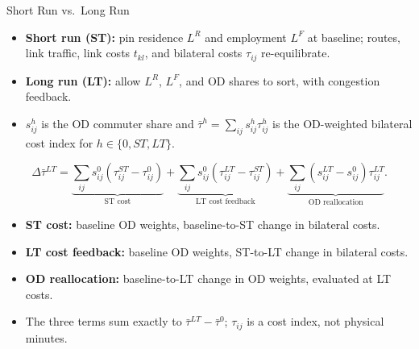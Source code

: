 \documentclass[11pt,aspectratio=169]{beamer}
\begin{document}
\begin{frame}{Short Run vs.\ Long Run}
\small
\begin{itemize}
  \item \textbf{Short run (ST):} pin residence $L^R$ and employment $L^F$ at baseline; routes, link traffic, link costs $t_{kl}$, and bilateral costs $\tau_{ij}$ re-equilibrate.
  \item \textbf{Long run (LT):} allow $L^R$, $L^F$, and OD shares to sort, with congestion feedback.
  \item $s_{ij}^h$ is the OD commuter share and $\bar\tau^h=\sum_{ij}s_{ij}^h\tau_{ij}^h$ is the OD-weighted bilateral cost index for $h\in\{0,ST,LT\}$.
\end{itemize}
\vspace{-0.55em}
{\footnotesize
\begin{equation*}
\Delta\bar\tau^{LT}=
\underbrace{\textstyle\sum_{ij}s_{ij}^0\left(\tau_{ij}^{ST}-\tau_{ij}^0\right)}_{\text{ST cost}}
+\underbrace{\textstyle\sum_{ij}s_{ij}^0\left(\tau_{ij}^{LT}-\tau_{ij}^{ST}\right)}_{\text{LT cost feedback}}
+\underbrace{\textstyle\sum_{ij}\left(s_{ij}^{LT}-s_{ij}^0\right)\tau_{ij}^{LT}}_{\text{OD reallocation}}.
\end{equation*}
}
\vspace{-0.85em}
\begin{itemize}\scriptsize\setlength\itemsep{0.25em}
  \item \textbf{ST cost:} baseline OD weights, baseline-to-ST change in bilateral costs.
  \item \textbf{LT cost feedback:} baseline OD weights, ST-to-LT change in bilateral costs.
  \item \textbf{OD reallocation:} baseline-to-LT change in OD weights, evaluated at LT costs.
  \item The three terms sum exactly to $\bar\tau^{LT}-\bar\tau^0$; $\tau_{ij}$ is a cost index, not physical minutes.
\end{itemize}
\end{frame}
\end{document}
